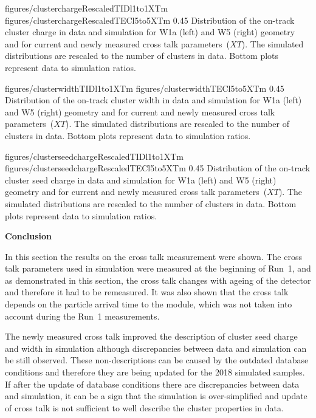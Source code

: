                  {figures/clusterchargeRescaledTIDl1to1XTm} %
                 {figures/clusterchargeRescaledTECl5to5XTm} %
                 {0.45}       %
                 { Distribution of the on-track cluster charge in data and simulation for W1a (left) and W5 (right) geometry and for current and newly measured cross talk parameters~($XT$).  The simulated distributions are rescaled to the number of clusters in data.  Bottom plots represent data to simulation ratios. }

                 {figures/clusterwidthTIDl1to1XTm}
                 {figures/clusterwidthTECl5to5XTm}
                 {0.45}       %
                 { Distribution of the on-track cluster width in data and simulation for W1a (left) and W5 (right) geometry and for current and newly measured cross talk parameters~($XT$).  The simulated distributions are rescaled to the number of clusters in data.  Bottom plots represent data to simulation ratios. }

                 {figures/clusterseedchargeRescaledTIDl1to1XTm} %
                 {figures/clusterseedchargeRescaledTECl5to5XTm} %
                 {0.45}       %
                 { Distribution of the on-track cluster seed charge in data and simulation for W1a (left) and W5 (right) geometry and for current and newly measured cross talk parameters~($XT$).  The simulated distributions are rescaled to the number of clusters in data.  Bottom plots represent data to simulation ratios. }

\textbf{Conclusion}

In this section the results on the cross talk measurement were shown. The cross talk parameters used in simulation were measured at the beginning of Run~1, and as demonstrated in this section, the cross talk changes with ageing of the detector and therefore it had to be remeasured. It was also shown that the cross talk depends on the particle arrival time to the module, which was not taken into account during the Run~1 measurements. 

The newly measured cross talk improved the description of cluster seed charge and width in  simulation although discrepancies between data and simulation can be still observed. These non-descriptions can be caused by the outdated database conditions and therefore they are being updated for the 2018 simulated samples. If after the update of database conditions there are discrepancies between data and simulation, it can be a sign that the simulation is over-simplified and update of cross talk is not sufficient to well describe the cluster properties in data.


